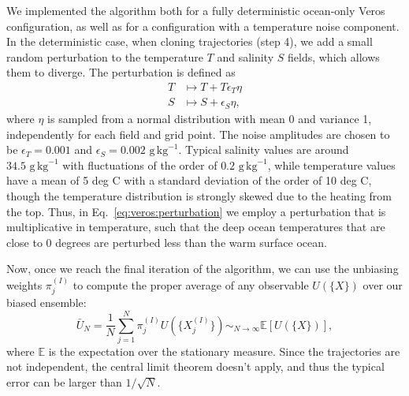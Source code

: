 We implemented the algorithm both for a fully deterministic ocean-only Veros configuration, as well as for a configuration with a temperature noise component. In the deterministic case, when cloning trajectories (step 4), we add a small random perturbation to the temperature $T$ and salinity $S$ fields, which allows them to diverge. The perturbation is defined as
\begin{equation}\label{eq:veros:perturbation}
    \begin{aligned}
        T &\mapsto T + T\epsilon_T \eta \\
        S &\mapsto S + \epsilon_S \eta ,
    \end{aligned}
\end{equation}
where $\eta$ is sampled from a normal distribution with mean 0 and variance 1, independently for each field and grid point. The noise amplitudes are chosen to be $\epsilon_T = 0.001$ and $\epsilon_S = 0.002 \,\, \text{g} \, \text{kg}^{-1}$. Typical salinity values are around $34.5 \,\, \text{g} \, \text{kg}^{-1}$ with fluctuations of the order of $0.2 \,\, \text{g} \, \text{kg}^{-1}$, while temperature values have a mean of 5 deg C with a standard deviation of the order of 10 deg C, though the temperature distribution is strongly skewed due to the heating from the top. Thus, in Eq.~\ref{eq:veros:perturbation} we employ a perturbation that is multiplicative in temperature, such that the deep ocean temperatures that are close to 0 degrees are perturbed less than the warm surface ocean.

Now, once we reach the final iteration of the algorithm, we can use the unbiasing weights $\pi_j^{(I)}$ to compute the proper average of any observable $U(\{X\})$ over our biased ensemble:
\begin{equation}\label{eq:veros:unbiased-averaging}
    \bar{U}_N = \frac{1}{N}\sum_{j=1}^N \pi_j^{(I)} U(\{X^{(I)}_j\}) \sim_{N \to \infty} \mathbb{E} \left[ U(\{X\}) \right],
\end{equation}
where $\mathbb{E}$ is the expectation over the stationary measure. Since the trajectories are not independent, the central limit theorem doesn't apply, and thus the typical error can be larger than $1/\sqrt{N}$.


